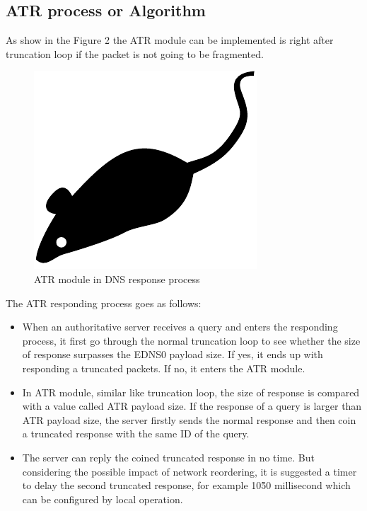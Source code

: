 \subsection{ATR process or Algorithm}

As show in the Figure 2 the ATR module can be implemented is right after truncation loop if the packet is not going to be fragmented.

\begin{figure}[tp]
\centering
\includegraphics{figures/mouse}
\caption{ATR module in DNS response process}
\end{figure}

The ATR responding process goes as follows:

\begin{itemize}
  \item When an authoritative server receives a query and enters the
      responding process, it first go through the normal truncation loop
      to see whether the size of response surpasses the EDNS0 payload
      size.  If yes, it ends up with responding a truncated packets.  If
      no, it enters the ATR module.
  \item In ATR module, similar like truncation loop, the size of response
      is compared with a value called ATR payload size.  If the response
      of a query is larger than ATR payload size, the server firstly
      sends the normal response and then coin a truncated response with
      the same ID of the query.
  \item The server can reply the coined truncated response in no time.
      But considering the possible impact of network reordering, it is
      suggested a timer to delay the second truncated response, for
      example 10\~50 millisecond which can be configured by local
      operation.
\end{itemize}

